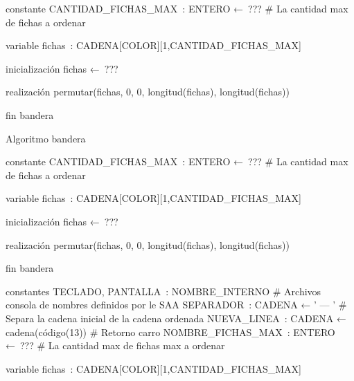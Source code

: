 constante
    CANTIDAD_FICHAS_MAX : ENTERO ← ???
        # La cantidad max de fichas a ordenar

variable
    fichas : CADENA[COLOR][1,CANTIDAD_FICHAS_MAX]

inicialización
    fichas ← ???

realización
    permutar(fichas, 0, 0, longitud(fichas), longitud(fichas))

fin bandera

Algoritmo bandera

constante
    CANTIDAD_FICHAS_MAX : ENTERO ← ???
        # La cantidad max de fichas a ordenar

variable
    fichas : CADENA[COLOR][1,CANTIDAD_FICHAS_MAX]

inicialización
    fichas ← ???

realización
    permutar(fichas, 0, 0, longitud(fichas), longitud(fichas))

fin bandera

constantes
    TECLADO, PANTALLA : NOMBRE_INTERNO
        # Archivos consola de nombres definidos por le SAA
    SEPARADOR : CADENA ← ’ — ’
        # Separa la cadena inicial de la cadena ordenada
    NUEVA_LINEA : CADENA ← cadena(código(13))
        # Retorno carro
    NOMBRE_FICHAS_MAX : ENTERO ← ???
        # La cantidad max de fichas max a ordenar

variable
    fichas : CADENA[COLOR][1,CANTIDAD_FICHAS_MAX]